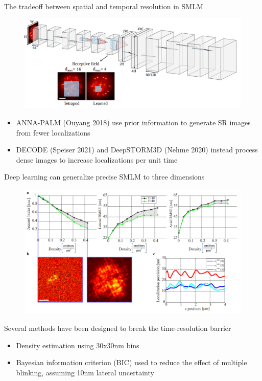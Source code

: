 \documentclass{beamer}					%
\begin{document}
\begin{frame}{The tradeoff between spatial and temporal resolution in SMLM}
\begin{figure}
\includegraphics[width=13cm]{Architecture.png}
\end{figure}
\begin{itemize}
\item ANNA-PALM (Ouyang 2018) use prior information to generate SR images from fewer localizations
\item DECODE (Speiser 2021) and DeepSTORM3D (Nehme 2020) instead process dense images to increase localizations per unit time
\end{itemize}
\end{frame}

\begin{frame}{Deep learning can generalize precise SMLM to three dimensions}
\begin{figure}
\includegraphics[width=12cm]{Jaccard.png}
\end{figure}
Several methods have been designed to break the time-resolution barrier
\begin{itemize}
\item Density estimation using 30x30nm bins
\item Bayesian information criterion (BIC) used to reduce the effect of multiple blinking, assuming 10nm lateral uncertainty
\end{itemize}
\end{frame}
\end{document}
